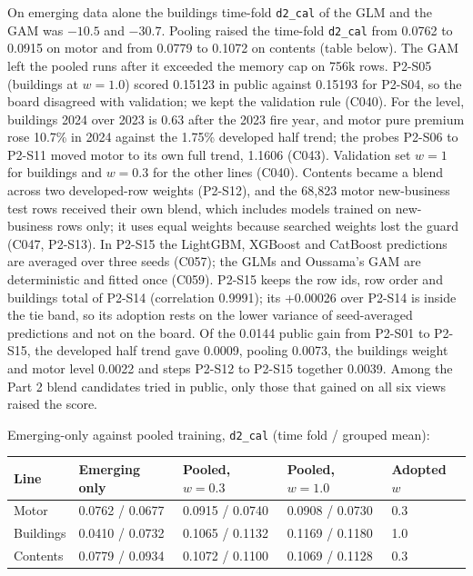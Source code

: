 \documentclass{rapport}
\begin{document}
On emerging data alone the buildings time-fold \texttt{d2\_cal} of the GLM and the GAM was $-10.5$ and $-30.7$. Pooling
raised the time-fold \texttt{d2\_cal} from 0.0762 to 0.0915 on motor and from 0.0779 to 0.1072 on contents (table
below). The GAM left the pooled runs after it exceeded the memory cap on 756k rows. P2-S05 (buildings at $w = 1.0$)
scored 0.15123 in public against 0.15193 for P2-S04, so the board disagreed with validation; we kept the validation
rule (C040). For the level, buildings 2024 over 2023 is 0.63 after the 2023 fire year, and motor pure premium rose
10.7\% in 2024 against the 1.75\% developed half trend; the probes P2-S06 to P2-S11 moved motor to its own full trend,
1.1606 (C043). Validation set $w = 1$ for buildings and $w = 0.3$ for the other lines (C040). Contents became a blend across
two developed-row weights (P2-S12), and the 68,823 motor new-business test rows received their own blend, which
includes models trained on new-business rows only; it uses equal weights because searched weights lost the guard
(C047, P2-S13). In P2-S15 the LightGBM, XGBoost and CatBoost predictions are averaged over three seeds
(C057); the GLMs and Oussama's GAM are deterministic and fitted once (C059). P2-S15
keeps the row ids, row order and buildings total of P2-S14 (correlation 0.9991); its +0.00026 over P2-S14 is inside
the tie band, so its adoption rests on the lower variance of seed-averaged predictions and not on the board. Of the
0.0144 public gain from P2-S01 to P2-S15, the developed half trend gave 0.0009, pooling 0.0073, the buildings weight
and motor level 0.0022 and steps P2-S12 to P2-S15 together 0.0039. Among the Part 2 blend candidates tried in public,
only those that gained on all six views raised the score.

Emerging-only against pooled training, \texttt{d2\_cal} (time fold / grouped mean):

\begin{center}
\small
\begin{tabular}{lllll}
\hline
Line & Emerging only & Pooled, $w = 0.3$ & Pooled, $w = 1.0$ & Adopted $w$\\
\hline
Motor & 0.0762 / 0.0677 & 0.0915 / 0.0740 & 0.0908 / 0.0730 & 0.3\\
Buildings & 0.0410 / 0.0732 & 0.1065 / 0.1132 & 0.1169 / 0.1180 & 1.0\\
Contents & 0.0779 / 0.0934 & 0.1072 / 0.1100 & 0.1069 / 0.1128 & 0.3\\
\hline
\end{tabular}
\end{center}
\end{document}
